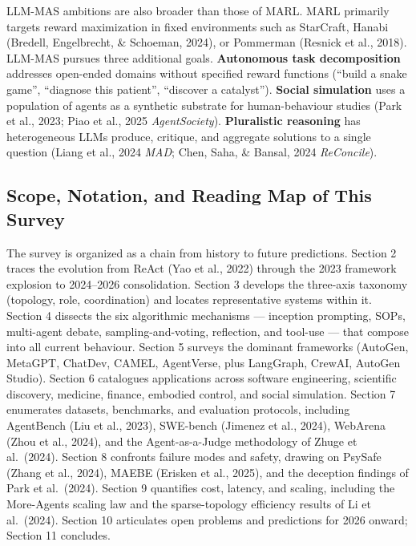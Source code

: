 LLM-MAS ambitions are also broader than those of MARL. MARL primarily targets reward maximization in fixed environments such as StarCraft, Hanabi (Bredell, Engelbrecht, \& Schoeman, 2024), or Pommerman (Resnick et al., 2018). LLM-MAS pursues three additional goals. \textbf{Autonomous task decomposition} addresses open-ended domains without specified reward functions (``build a snake game'', ``diagnose this patient'', ``discover a catalyst''). \textbf{Social simulation} uses a population of agents as a synthetic substrate for human-behaviour studies (Park et al., 2023; Piao et al., 2025 \emph{AgentSociety}). \textbf{Pluralistic reasoning} has heterogeneous LLMs produce, critique, and aggregate solutions to a single question (Liang et al., 2024 \emph{MAD}; Chen, Saha, \& Bansal, 2024 \emph{ReConcile}).

\subsection{Scope, Notation, and Reading Map of This Survey}\label{scope-notation-and-reading-map-of-this-survey}

The survey is organized as a chain from history to future predictions. Section 2 traces the evolution from ReAct (Yao et al., 2022) through the 2023 framework explosion to 2024--2026 consolidation. Section 3 develops the three-axis taxonomy (topology, role, coordination) and locates representative systems within it. Section 4 dissects the six algorithmic mechanisms --- inception prompting, SOPs, multi-agent debate, sampling-and-voting, reflection, and tool-use --- that compose into all current behaviour. Section 5 surveys the dominant frameworks (AutoGen, MetaGPT, ChatDev, CAMEL, AgentVerse, plus LangGraph, CrewAI, AutoGen Studio). Section 6 catalogues applications across software engineering, scientific discovery, medicine, finance, embodied control, and social simulation. Section 7 enumerates datasets, benchmarks, and evaluation protocols, including AgentBench (Liu et al., 2023), SWE-bench (Jimenez et al., 2024), WebArena (Zhou et al., 2024), and the Agent-as-a-Judge methodology of Zhuge et al.~(2024). Section 8 confronts failure modes and safety, drawing on PsySafe (Zhang et al., 2024), MAEBE (Erisken et al., 2025), and the deception findings of Park et al.~(2024). Section 9 quantifies cost, latency, and scaling, including the More-Agents scaling law and the sparse-topology efficiency results of Li et al.~(2024). Section 10 articulates open problems and predictions for 2026 onward; Section 11 concludes.

